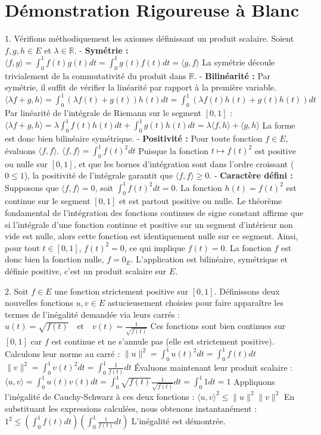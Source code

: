 \documentclass{report}
\begin{document}
\section*{Démonstration Rigoureuse à Blanc}

1. Vérifions méthodiquement les axiomes définissant un produit scalaire. Soient $f, g, h \in E$ et $\lambda \in \mathbb{R}$.
   - \textbf{Symétrie :}
     $ \langle f, g \rangle = \int_0^1 f(t)g(t) dt = \int_0^1 g(t)f(t) dt = \langle g, f \rangle $
     La symétrie découle trivialement de la commutativité du produit dans $\mathbb{R}$.
   - \textbf{Bilinéarité :} Par symétrie, il suffit de vérifier la linéarité par rapport à la première variable.
     $ \langle \lambda f + g, h \rangle = \int_0^1 (\lambda f(t) + g(t))h(t) dt = \int_0^1 (\lambda f(t)h(t) + g(t)h(t)) dt $
     Par linéarité de l'intégrale de Riemann sur le segment $[0, 1]$ :
     $ \langle \lambda f + g, h \rangle = \lambda \int_0^1 f(t)h(t) dt + \int_0^1 g(t)h(t) dt = \lambda \langle f, h \rangle + \langle g, h \rangle $
     La forme est donc bien bilinéaire symétrique.
   - \textbf{Positivité :} Pour toute fonction $f \in E$, évaluons $\langle f, f \rangle$.
     $ \langle f, f \rangle = \int_0^1 f(t)^2 dt $
     Puisque la fonction $t \mapsto f(t)^2$ est positive ou nulle sur $[0, 1]$, et que les bornes d'intégration sont dans l'ordre croissant ($0 \le 1$), la positivité de l'intégrale garantit que $\langle f, f \rangle \ge 0$.
   - \textbf{Caractère défini :} Supposons que $\langle f, f \rangle = 0$, soit $\int_0^1 f(t)^2 dt = 0$.
     La fonction $h(t) = f(t)^2$ est continue sur le segment $[0, 1]$ et est partout positive ou nulle. Le théorème fondamental de l'intégration des fonctions continues de signe constant affirme que si l'intégrale d'une fonction continue et positive sur un segment d'intérieur non vide est nulle, alors cette fonction est identiquement nulle sur ce segment.
     Ainsi, pour tout $t \in [0, 1]$, $f(t)^2 = 0$, ce qui implique $f(t) = 0$. La fonction $f$ est donc bien la fonction nulle, $f = 0_E$.
   L'application est bilinéaire, symétrique et définie positive, c'est un produit scalaire sur $E$.

2. Soit $f \in E$ une fonction strictement positive sur $[0, 1]$. Définissons deux nouvelles fonctions $u, v \in E$ astucieusement choisies pour faire apparaître les termes de l'inégalité demandée via leurs carrés :
   $ u(t) = \sqrt{f(t)} \quad \text{et} \quad v(t) = \frac{1}{\sqrt{f(t)}} $
   Ces fonctions sont bien continues sur $[0, 1]$ car $f$ est continue et ne s'annule pas (elle est strictement positive).
   Calculons leur norme au carré :
   $ \|u\|^2 = \int_0^1 u(t)^2 dt = \int_0^1 f(t) dt $
   $ \|v\|^2 = \int_0^1 v(t)^2 dt = \int_0^1 \frac{1}{f(t)} dt $
   Évaluons maintenant leur produit scalaire :
   $ \langle u, v \rangle = \int_0^1 u(t)v(t) dt = \int_0^1 \sqrt{f(t)} \frac{1}{\sqrt{f(t)}} dt = \int_0^1 1 dt = 1 $
   Appliquons l'inégalité de Cauchy-Schwarz à ces deux fonctions :
   $ \langle u, v \rangle^2 \le \|u\|^2 \|v\|^2 $
   En substituant les expressions calculées, nous obtenons instantanément :
   $ 1^2 \le \left( \int_0^1 f(t) dt \right) \left( \int_0^1 \frac{1}{f(t)} dt \right) $
   L'inégalité est démontrée.
\end{document}
